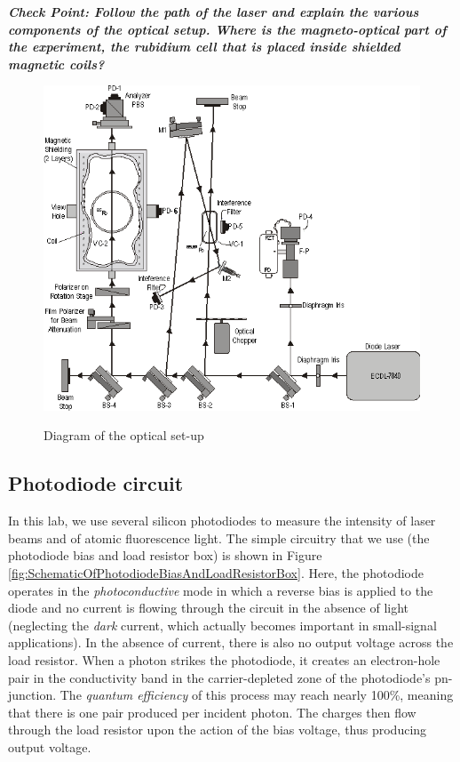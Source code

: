 \documentclass{../lab}
\begin{document}
\emph{\textbf{Check Point: Follow the path of the laser and explain the various components of the optical setup. Where is the magneto-optical part of the experiment, the rubidium cell that is placed inside shielded magnetic coils?}}

\begin{figure}[h]
    \centering
    \href{http://experimentationlab.berkeley.edu/sites/default/files/images/MNOimage003.gif}{\includegraphics[width=0.6\linewidth]{images/MNOimage003.png}}
    \caption{Diagram of the optical set-up}
    \label{fig:DiagramOfOpticalSetup}
\end{figure}

\subsection{Photodiode circuit}

In this lab, we use several silicon photodiodes to measure the intensity of laser beams and of atomic fluorescence light. The simple circuitry that we use (the photodiode bias and load resistor box) is shown in Figure \ref{fig:SchematicOfPhotodiodeBiasAndLoadResistorBox}. Here, the photodiode operates in the \emph{photoconductive} mode in which a reverse bias is applied to the diode and no current is flowing through the circuit in the absence of light (neglecting the \emph{dark} current, which actually becomes important in small-signal applications). In the absence of current, there is also no output voltage across the load resistor. When a photon strikes the photodiode, it creates an electron-hole pair in the conductivity band in the carrier-depleted zone of the photodiode's pn-junction. The \emph{quantum efficiency} of this process may reach nearly 100\%, meaning that there is one pair produced per incident photon. The charges then flow through the load resistor upon the action of the bias voltage, thus producing output voltage.
\end{document}
